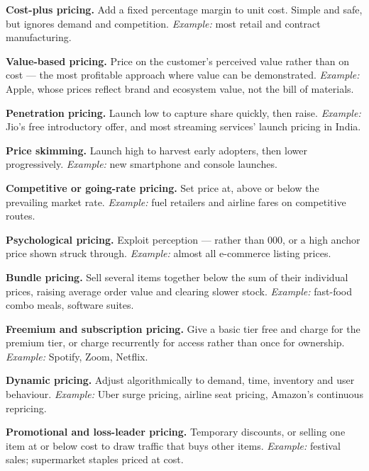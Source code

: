 \begin{qlist}
\begin{apts}
\item \textbf{Cost-plus pricing.} Add a fixed percentage margin to unit cost.
      Simple and safe, but ignores demand and competition. \emph{Example:}
      most retail and contract manufacturing.
\item \textbf{Value-based pricing.} Price on the customer's perceived value
      rather than on cost --- the most profitable approach where value can be
      demonstrated. \emph{Example:} Apple, whose prices reflect brand and
      ecosystem value, not the bill of materials.
\item \textbf{Penetration pricing.} Launch low to capture share quickly, then
      raise. \emph{Example:} Jio's free introductory offer, and most
      streaming services' launch pricing in India.
\item \textbf{Price skimming.} Launch high to harvest early adopters, then
      lower progressively. \emph{Example:} new smartphone and console launches.
\item \textbf{Competitive or going-rate pricing.} Set price at, above or below
      the prevailing market rate. \emph{Example:} fuel retailers and airline
      fares on competitive routes.
\item \textbf{Psychological pricing.} Exploit perception ---  rather than
      000, or a high anchor price shown struck through.
      \emph{Example:} almost all e-commerce listing prices.
\item \textbf{Bundle pricing.} Sell several items together below the sum of
      their individual prices, raising average order value and clearing slower
      stock. \emph{Example:} fast-food combo meals, software suites.
\item \textbf{Freemium and subscription pricing.} Give a basic tier free and
      charge for the premium tier, or charge recurrently for access rather than
      once for ownership. \emph{Example:} Spotify, Zoom, Netflix.
\item \textbf{Dynamic pricing.} Adjust algorithmically to demand, time,
      inventory and user behaviour. \emph{Example:} Uber surge pricing, airline
      seat pricing, Amazon's continuous repricing.
\item \textbf{Promotional and loss-leader pricing.} Temporary discounts, or
      selling one item at or below cost to draw traffic that buys other items.
      \emph{Example:} festival sales; supermarket staples priced at cost.
\end{apts}


\end{qlist}
